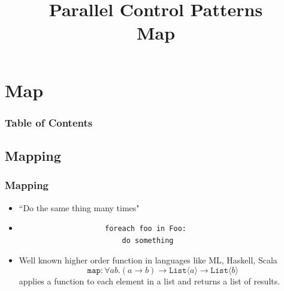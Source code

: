 \documentclass[xcolor=dvipsnames]{beamer}
\begin{document}
	\title[Map Pattern]{Parallel Control Patterns\\Map}
	\author[]{\className}
	\institute[\className]{\departmentName}
	\date{} 


	\begin{frame}
		\maketitle
	\end{frame}


\section{Map} 

	\begin{frame} \frametitle{Table of Contents}
		\tableofcontents[currentsection]
	\end{frame} 
	
	
	\subsection*{Mapping}
		\begin{frame}[fragile] \frametitle{Mapping}
			\begin{itemize}
					\item ``Do the same thing many times"
					\item \begin{verbatim}
					foreach foo in Foo:
					    do something
					\end{verbatim}
					\item Well known higher order function in languages like ML, 
					Haskell, Scala
					\[ \texttt{map} : \forall a b. (a \to b) \to \texttt{List}\langle 
					a\rangle \to \texttt{List}\langle b\rangle \]
					applies a function to each element in a list and returns a list 
	                of results.\\
			\end{itemize}
		\end{frame}
			
\end{document}
